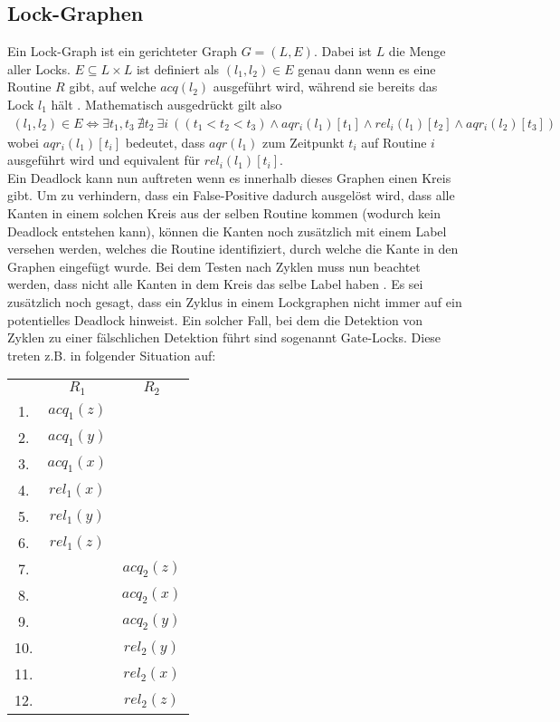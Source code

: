 \subsection{Lock-Graphen}
Ein Lock-Graph ist ein gerichteter Graph $G = (L, E)$. Dabei ist $L$ die Menge 
aller Locks. $E \subseteq L \times L$ ist definiert als $(l_1, l_2) \in E$ genau 
dann wenn es eine Routine $R$ gibt, auf welche $acq(l_2)$ ausgeführt wird, während sie 
bereits das Lock $l_1$ hält \cite{bensalem}. Mathematisch ausgedrückt gilt also 
\begin{align*}
    (l_1, l_2) \in E \Leftrightarrow \exists t_1, t_3\ \nexists t_2\ \exists i\ ((t_1 < t_2 < t_3) \land aqr_i(l_1)[t_1] \land rel_i(l_1)[t_2] \land  aqr_i(l_2)[t_3])
\end{align*}
wobei $aqr_i(l_1)[t_i]$ bedeutet, dass $aqr(l_1)$ zum Zeitpunkt $t_i$ auf Routine 
$i$ ausgeführt wird und equivalent für $rel_i(l_1)[t_i]$.\\
Ein Deadlock kann nun auftreten wenn es innerhalb dieses Graphen einen Kreis 
gibt. Um zu verhindern, dass ein False-Positive dadurch ausgelöst wird, dass 
alle Kanten in einem solchen Kreis aus der selben Routine kommen (wodurch kein 
Deadlock entstehen kann), können die Kanten noch zusätzlich mit einem Label 
versehen werden, welches die Routine identifiziert, durch welche die Kante in 
den Graphen eingefügt wurde. Bei dem Testen nach Zyklen muss nun beachtet 
werden, dass nicht alle Kanten in dem Kreis das selbe Label haben 
\cite{bensalem}. Es sei zusätzlich noch gesagt, dass ein Zyklus in einem 
Lockgraphen nicht immer auf ein potentielles Deadlock hinweist. Ein solcher 
Fall, bei dem die Detektion von Zyklen zu einer fälschlichen Detektion 
führt sind sogenannt Gate-Locks. Diese treten z.B. in folgender Situation
auf:
\begin{table}[H]
     \centering
     \begin{tabular}{ccc}
        & $R_1$        & $R_2$          \\
     1. & $acq_{1}(z)$ &                \\
     2. & $acq_{1}(y)$ &                \\
     3. & $acq_{1}(x)$ &                \\
     4. & $rel_{1}(x)$ &                \\
     5. & $rel_{1}(y)$ &                \\
     6. & $rel_{1}(z)$ &                \\
     7. &              & $acq_{2}(z)$ \\
     8. &              & $acq_{2}(x)$ \\
     9. &              & $acq_{2}(y)$ \\
    10. &              & $rel_{2}(y)$ \\
    11. &              & $rel_{2}(x)$ \\
    12. &              & $rel_{2}(z)$
    \end{tabular}
\end{table}
